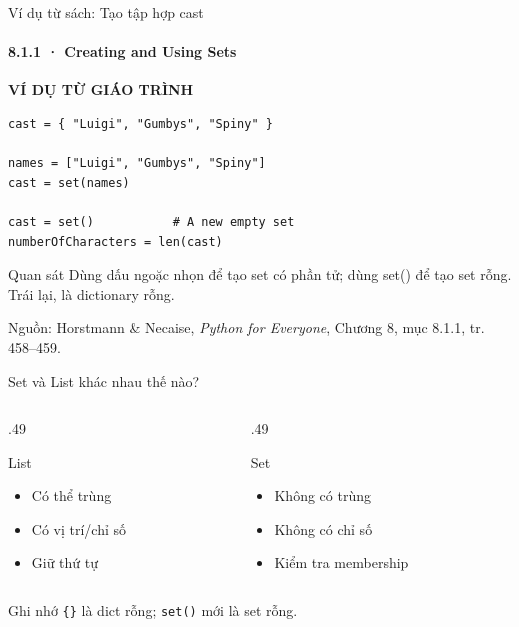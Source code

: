 \documentclass[aspectratio=169,10pt]{beamer}
\newcommand{\py}[1]{{\color{deepnavy}\texttt{#1}}}
\begin{document}
\begin{frame}[fragile,t]{Ví dụ từ sách: Tạo tập hợp cast}
\framesubtitle{8.1.1 · Creating and Using Sets}
{\small\color{teal}\textbf{VÍ DỤ TỪ GIÁO TRÌNH}}\par\medskip
\begin{Verbatim}[fontsize=\footnotesize,frame=single,framesep=3mm,rulecolor=\color{teal!35},breaklines=true]
cast = { "Luigi", "Gumbys", "Spiny" }

names = ["Luigi", "Gumbys", "Spiny"]
cast = set(names)

cast = set()           # A new empty set
numberOfCharacters = len(cast)
\end{Verbatim}
\begin{block}{Quan sát}
Dùng dấu ngoặc nhọn để tạo set có phần tử; dùng set() để tạo set rỗng. Trái lại, {} là dictionary rỗng.
\end{block}
\vfill
{\scriptsize\color{muted}Nguồn: Horstmann \& Necaise, \textit{Python for Everyone}, Chương 8, mục 8.1.1, tr. 458–459.}
\end{frame}


\begin{frame}[t]{Set và List khác nhau thế nào?}

\begin{columns}[T,onlytextwidth]
\begin{column}{.49\linewidth}
\begin{block}{List}
\centering{}
\medskip\begin{itemize}\item Có thể trùng\item Có vị trí/chỉ số\item Giữ thứ tự\end{itemize}
\end{block}
\end{column}
\begin{column}{.49\linewidth}
\begin{block}{Set}
\centering{}
\medskip\begin{itemize}\item Không có trùng\item Không có chỉ số\item Kiểm tra membership\end{itemize}
\end{block}
\end{column}
\end{columns}
\begin{alertblock}{Ghi nhớ} \py{\{\}} là dict rỗng; \py{set()} mới là set rỗng. \end{alertblock}

\end{frame}
\end{document}
